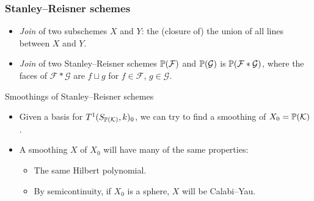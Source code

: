 \begin{frame}
\frametitle{Stanley--Reisner schemes}

\begin{itemize}
	\item \emph{Join} of two subschemes $X$ and $Y$: the (closure of) the union of all lines between $X$ and $Y$.
	\item \emph{Join} of two Stanley--Reisner schemes $\P(\mathcal F)$ and $\P(\mathcal G)$ is $\P(\mathcal F \ast \mathcal G)$, where the faces of $\mathcal F  \ast \mathcal G$ are $f \sqcup g$ for $f \in \mathcal F$, $g \in \mathcal G$.
\end{itemize}

\pause

Smoothings of Stanley--Reisner schemes

\begin{itemize}
	\item Given a basis for $T^1(S_{\P(\mathcal K)},k)_0$, we can try to find a smoothing of $X_0 = \P(\mathcal K)$.
	\item A smoothing $X$ of $X_0$ will have many of the same properties:
		\begin{itemize}
			\item The same Hilbert polynomial.
			\item By semicontinuity, if $X_0$ is a sphere, $X$ will be Calabi--Yau. %
		\end{itemize}
\end{itemize}


\end{frame}